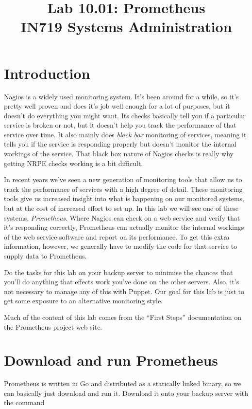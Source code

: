 \documentclass{article}   	%
\title{Lab 10.01:  Prometheus\\ IN719 Systems Administration}
\date{}							%
\begin{document}
\maketitle

\section*{Introduction}
Nagios is a widely used monitoring system. It's been around for a while, so it's pretty well proven and does it's job well enough for a lot of purposes, but it doesn't do everything you might want. Its checks basically tell you if a particular service is broken or not, but it doesn't help you track the performance of that service over time. It also mainly does \emph{black box} monitoring of services, meaning it tells you if the service is responding properly but doesn't monitor the internal workings of the service. That black box nature of Nagios checks is really why getting NRPE checks working is a bit difficult.

In recent years we've seen a new generation of monitoring tools that allow us to track the performance of services with a high degree of detail. These monitoring tools give us increased insight into what is happening on our monitored systems, but at the cost of increased effort to set up. In this lab we will see one of these systems, \emph{Prometheus}. Where Nagios can check on a web service and verify that it's responding correctly, Prometheus can actually monitor the internal workings of the web service software and report on its performance. To get this extra information, however, we generally have to modify the code for that service to supply data to Prometheus.

Do the tasks for this lab on your backup server to minimise the chances that you'll do anything that effects work you've done on the other servers. Also, it's not necessary to manage any of this with Puppet. Our goal for this lab is just to get some exposure to an alternative monitoring style.

Much of the content of this lab comes from the ``First Steps'' documentation on the Prometheus project web site.

\section{Download and run Prometheus}
Prometheus is written in Go and distributed as a statically linked binary, so we can basically just download and run it. Download it onto your backup server with the command
\end{document}
